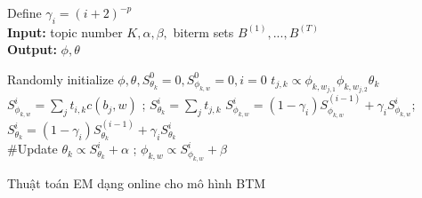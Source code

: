 \documentclass[pdf]{beamer}
\begin{document}
\begin{frame}
\begin{algorithm}[H]
	Define $ \gamma_i = (i+2)^{-p}$ \\
	\textbf{Input: } topic number $K, \alpha, \beta,$ biterm sets $B^{(1)}, ..., B^{(T)}$  \\
	\textbf{Output: } $\phi, \theta$ 
	\begin{algorithmic}[1]
		\STATE Randomly initialize $\phi, \theta,  S_{\theta_k}^0 = 0, S_{\phi_{k, w}}^0 = 0, i = 0$
		\STATE $ t_{j, k} \propto {\phi_{k,w_{j,1}} \phi_{k,w_{j,2}} \theta_k}$
		\ENDFOR
		\STATE  $S_{\phi_{k, w}}^i = \sum_{j}{t_{i, k}c(b_j, w)}$ ; \space  $S_{\theta_k}^i = \sum_{j}{t_{j, k}} $
		\STATE$S_{\phi_{k, w}}^i = (1 - \gamma_i) S_{\phi_{k, w}}^{(i-1)} + \gamma_i S_{\phi_{k, w}}^i$; \space $S_{\theta_k}^i = (1 - \gamma_i)S_{\theta_k}^{(i-1)} + \gamma_i S_{\theta_k}^i$\\ \#Update
		\STATE $\theta_k \propto S_{\theta_k}^i + \alpha$ ; \space $\phi_{k, w} \propto S_{\phi_{k, w}}^i + \beta $
		\ENDFOR
	\end{algorithmic}
	\caption{Thuật toán EM dạng online cho mô hình BTM }
	\label{alg:seq}
\end{algorithm}
\end{frame}
\end{document}
